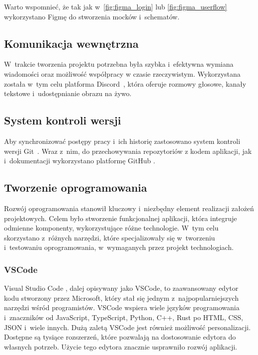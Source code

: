 Warto wspomnieć, że tak jak w~\ref{fig:figma_login} lub
\ref{fig:figma_userflow} wykorzystano Figmę do stworzenia mocków i~schematów.

\FloatBarrier

\subsection{Komunikacja wewnętrzna}

W~trakcie tworzenia projektu potrzebna była szybka i~efektywna
wymiana wiadomości oraz możliwość współpracy w czasie rzeczywistym.
Wykorzystana została w~tym celu platforma Discord~\cite{Discord},
która oferuje rozmowy głosowe, kanały tekstowe i~udostępnianie
obrazu na żywo.


\subsection{System kontroli wersji}

Aby synchronizować postępy pracy i~ich historię zastosowano
system kontroli wersji Git~\cite{Git}. Wraz z~nim, do przechowywania
repozytoriów z kodem aplikacji, jak i~dokumentacji wykorzystano
platformę GitHub \cite{Github}.


\subsection{Tworzenie oprogramowania}

Rozwój oprogramowania stanowił kluczowy i~niezbędny element realizacji
założeń projektowych.
Celem było stworzenie funkcjonalnej aplikacji, która integruje
odmienne komponenty, wykorzystujące różne technologie.
W~tym celu skorzystano z~różnych narzędzi, które specjalizowały się
w~tworzeniu i~testowaniu oprogramowania, w~wymaganych przez projekt
technologiach.


\subsubsection{VSCode}

Visual Studio Code \cite{VSCode}, dalej opisywany jako VSCode,
to zaawansowany edytor kodu stworzony
przez Microsoft, który stał się jednym z~najpopularniejszych narzędzi
wśród programistów\cite{IDEIndex}.
VSCode wspiera wiele języków programowania i~znaczników od JavaScript,
TypeScript, Python, C++, Rust po HTML, CSS, JSON i~wiele innych.
Dużą zaletą VSCode jest również możliwość personalizacji. Dostępne są
tysiące rozszerzeń, które pozwalają na dostosowanie edytora do własnych
potrzeb. Użycie tego edytora znacznie usprawniło rozwój aplikacji.

